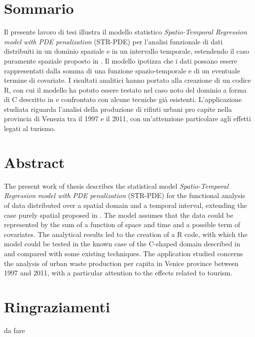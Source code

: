 \documentclass[a4paper,11pt,twoside,openright]{book}							%
\begin{document}
\chapter*{Sommario}
\label{Cap:sommario}
\thispagestyle{empty}
Il presente lavoro di tesi illustra il modello statistico \textit{Spatio-Temporal Regression model with PDE penalization} (STR-PDE) per l'analisi funzionale di dati distribuiti in un dominio spaziale e in un intervallo temporale, estendendo il caso puramente spaziale proposto in \cite{art:sangalli}. Il modello ipotizza che i dati possano essere rappresentati dalla somma di una funzione spazio-temporale e di un eventuale termine di covariate. I risultati analitici hanno portato alla creazione di un codice R, con cui il modello ha potuto essere testato nel caso noto del dominio a forma di C descritto in \cite{art:ramsay} e confrontato con alcune tecniche già esistenti. L'applicazione studiata riguarda l'analisi della produzione di rifiuti urbani pro capite nella provincia di Venezia tra il 1997 e il 2011, con un'attenzione particolare agli effetti legati al turismo.
\newpage
\thispagestyle{empty}
\chapter*{Abstract}
\label{Cap:abstract}
\thispagestyle{empty}
The present work of thesis describes the statistical model \textit{Spatio-Temporal Regression model with PDE penalization} (STR-PDE) for the functional analysis of data distributed over a spatial domain and a temporal interval, extending the case purely spatial proposed in \cite{art:sangalli}. The model assumes that the data could be represented by the sum of a function of space and time and a possible term of covariates. The analytical results led to the creation of a R code, with which the model could be tested in the known case of the C-shaped domain described in \cite{art:ramsay} and compared with some existing techniques. The application studied concerns the analysis of urban waste production per capita in Venice province between 1997 and 2011, with a particular attention to the effects related to tourism.
\newpage
\thispagestyle{empty}

\chapter*{Ringraziamenti}
\thispagestyle{empty}
da fare
\newpage
\thispagestyle{empty}

\frontmatter
\tableofcontents
{}
\listoffigures
{}
\listoftables
{}
\newpage
\thispagestyle{empty}
\mainmatter
\end{document}
